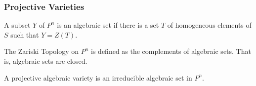 \documentclass[crop=false,class=article,oneside]{standalone}
\begin{document}
    \subsubsection{Projective Varieties}
    \begin{definition}
    A subset $Y$ of $P^n$ is an algebraic set if there is a set $T$ of homogeneous elements of $S$ such that $Y=Z(T)$.
    \end{definition}
    \begin{definition}
    The Zariski Topology on $P^n$ is defined as the complements of algebraic sets. That is, algebraic sets are closed.
    \end{definition}
    \begin{definition}
    A projective algebraic variety is an irreducible algebraic set in $P^n$.
    \end{definition}
\end{document}
